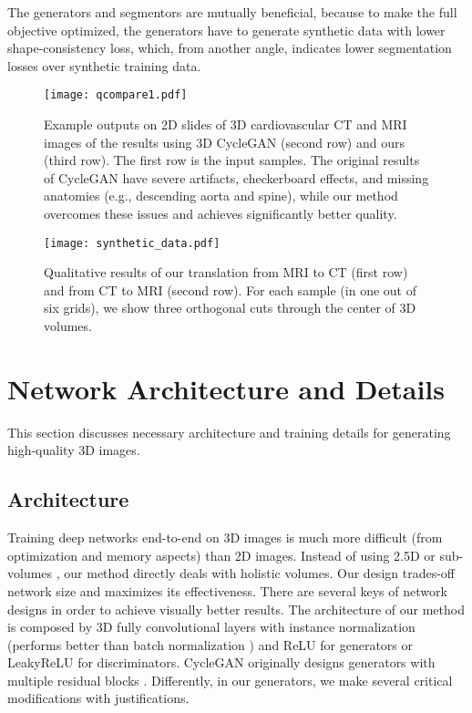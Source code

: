\documentclass[10pt,twocolumn,letterpaper]{article}
\begin{document}
The generators and segmentors are mutually beneficial, because to make the full objective optimized, the generators have to generate synthetic data with lower shape-consistency loss, which, from another angle, indicates lower segmentation losses over synthetic training data.  

\begin{figure}[t]
	\begin{center}
		\texttt{[image: qcompare1.pdf]}
	\end{center}
	\vspace{-.2cm}
	\caption{Example outputs on 2D slides of 3D cardiovascular CT and MRI images of the results using 3D CycleGAN (second row) and ours (third row). The first row is the input samples.
	The original results of CycleGAN have severe artifacts, checkerboard effects, and missing anatomies (e.g., descending aorta and spine), while our method overcomes these issues and achieves significantly better quality.} \label{fig:qcomare1}
\end{figure}

\begin{figure*}[t]
	\begin{center}
		\texttt{[image: synthetic\_data.pdf]}
	\end{center}
	\vspace{-.4cm}
	\caption{Qualitative results of our translation from MRI to CT (first row) and from CT to MRI (second row). For each sample (in one out of six grids), we show three orthogonal cuts through the center of 3D volumes. } \label{fig:synthetic_data} 
\end{figure*}

\section{Network Architecture and Details}
This section discusses necessary architecture and training details for generating high-quality 3D images.
\subsection{Architecture}
Training deep networks end-to-end on 3D images is much more difficult (from optimization and memory aspects) than 2D images. 
Instead of using 2.5D \cite{roth2014new} or sub-volumes \cite{kamnitsas2017unsupervised}, our method directly deals with holistic volumes. Our design trades-off network size and maximizes its effectiveness.
There are several keys of network designs in order to achieve visually better results. 
The architecture of our method is composed by 3D fully convolutional layers with instance normalization \cite{ulyanov2016instance} (performs better than batch normalization \cite{ioffe2015batch}) and ReLU for generators or LeakyReLU for discriminators. 
CycleGAN originally designs generators with multiple residual blocks \cite{he2016deep}.
Differently, in our generators, we make several critical modifications with justifications.
\end{document}
